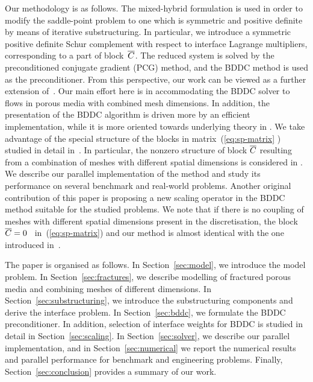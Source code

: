 Our methodology is as follows. The mixed-hybrid formulation \cite{Maryska-1995-MHF,Oden-1977-DMH} is used in order
to modify the saddle-point problem to one which is symmetric and positive
definite by means of iterative substructuring. 
In particular, we 
introduce a symmetric positive definite Schur complement with respect to
interface Lagrange multipliers, corresponding to a part of block~$\overline{C}$.
The
reduced system is solved by the preconditioned conjugate gradient (PCG)
method, and the BDDC method is used as the preconditioner. From this
perspective, our work can be viewed as a further extension
of~\cite{Tu-2007-BAF}. Our main effort here is in accommodating the BDDC
solver to flows in porous media with combined mesh dimensions. 
In addition, the presentation of the BDDC algorithm is driven more by an efficient implementation,
while it is more oriented towards underlying theory in \cite{Tu-2007-BAF}.
We take
advantage of the special structure of the blocks in matrix~(\ref{eq:sp-matrix}%
) studied in detail in~\cite{Maryska-1995-MHF,Maryska-2000-SCS,
Maryska-2005-NSF}. 
In particular,
the nonzero structure of block $\overline{C}$ resulting from a combination of meshes with
different spatial dimensions is considered
in \cite{Brezina-2010-MHF}. 
We describe our parallel
implementation of the method and study its performance on several benchmark
and real-world problems. Another original contribution of this paper is
proposing a new scaling operator in the BDDC method suitable for the studied
problems. We note that if there is no coupling of meshes with different
spatial dimensions present in the discretisation, the block $\overline{C}=0$%
\ in~(\ref{eq:sp-matrix}) and our method is almost identical with the one introduced
in~\cite{Tu-2007-BAF}.

The paper is organised as follows. In Section~\ref{sec:model}, we introduce
the model problem. In Section~\ref{sec:fractures}, we describe modelling of
fractured porous media and combining meshes of different dimensions. In
Section~\ref{sec:substructuring}, we introduce the substructuring components
and derive the interface problem. In Section~\ref{sec:bddc}, we formulate the
BDDC preconditioner. 
In addition, selection of interface weights for BDDC is studied in detail in Section~\ref{sec:scaling}.
In Section~\ref{sec:solver}, we describe our parallel
implementation, and in Section~\ref{sec:numerical} we report the numerical
results and parallel performance for benchmark and engineering problems.
Finally, Section~\ref{sec:conclusion} provides a summary of our work.

